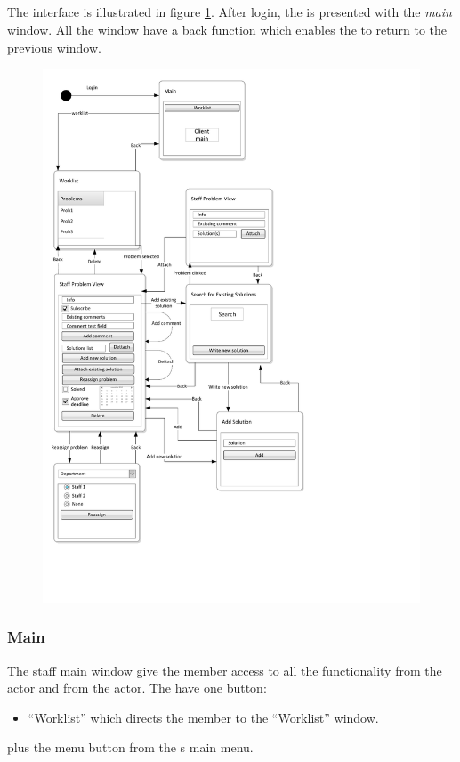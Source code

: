 
\subsection{\sinterface}
The \astaff[] interface is illustrated in figure \ref{fig:staff_interface}.
After login, the \astaff[] is presented with the \textit{main} window. All the window have a back function which enables the \astaff[] to return to the previous window.

\begin{figure}[H]
	\centering
		\includegraphics[width = \textwidth, clip=true, trim=0 4cm 5cm 0]{input/application_domain_analysis/Navigation_DiagramStaff.pdf}
	\morscaption{\sinterface[c]}
	\label{fig:staff_interface} %
\end{figure}

\subsubsection{Main}
The staff main window give the \astaff member access to all the functionality from the \astaff actor and from the \aclient actor. The \astaff have one button:
\begin{itemize}
	\item ``Worklist'' which directs the \astaff member to the ``Worklist'' window. 
\end{itemize}   
plus the menu button from the \aclient s main menu.

